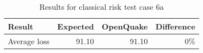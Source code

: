 \begin{table}[htbp]

\centering
\begin{tabular}{ l r r r }

\hline
\rowcolor{anti-flashwhite}
\bf{Result} & \bf{Expected} & \bf{OpenQuake} & \bf{Difference}\\
\hline
Average loss & 91.10 & 91.10 & 0\% \\
\hline
\end{tabular}

\caption{Results for classical risk test case 6a}
\label{tab:result-cr-6a}
\end{table}